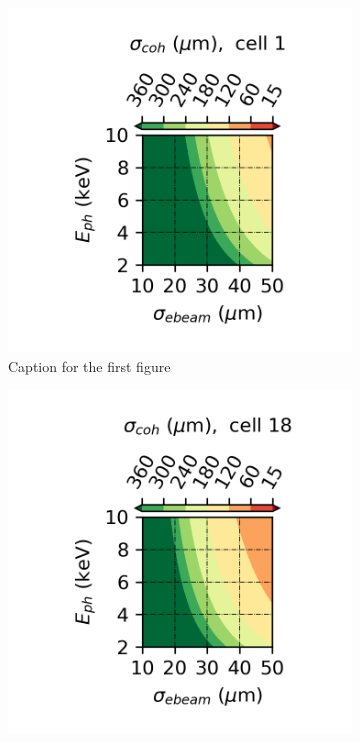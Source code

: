     \begin{figure}[h!]
        \centering
        \begin{subfigure}[b]{0.32\textwidth}
            \centering
            \includegraphics[trim={0.4cm 0 0.4cm 0}, clip, width=\textwidth]{content/images/ebeam_size_with_SR/cell 1.png}
            \caption{Caption for the first figure}
            \label{Fig:cell_2}
        \end{subfigure}
        \hfill %
        \begin{subfigure}[b]{0.32\textwidth}
            \centering
            \includegraphics[trim={0.4cm 0 0.4cm 0}, clip, width=\textwidth]{content/images/ebeam_size_with_SR/cell 18.png}

\end{subfigure}
\end{figure}
